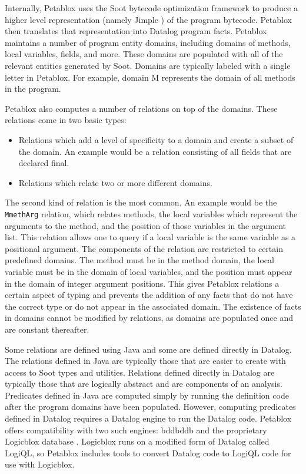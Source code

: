 Internally, Petablox uses the Soot bytecode optimization framework \cite{vallee1999soot} to produce a higher level representation (namely Jimple \cite{vallee1998jimple}) of the program bytecode. Petablox then translates that representation into Datalog program facts. Petablox maintains a number of program entity domains, including domains of methods, local variables, fields, and more. These domains are populated with all of the relevant entities generated by Soot. Domains are typically labeled with a single letter in Petablox. For example, domain M represents the domain of all methods in the program.

Petablox also computes a number of relations on top of the domains. These relations come in two basic types:

\begin{itemize}
  \item Relations which add a level of specificity to a domain and create a subset of the domain. An example would be a relation consisting of all fields that are declared final.
  \item Relations which relate two or more different domains.
\end{itemize}

The second kind of relation is the most common. An example would be the \texttt{MmethArg} relation, which relates methods, the local variables which represent the arguments to the method, and the position of those variables in the argument list. This relation allows one to query if a local variable is the same variable as a positional argument. The components of the relation are restricted to certain predefined domains. The method must be in the method domain, the local variable must be in the domain of local variables, and the position must appear in the domain of integer argument positions. This gives Petablox relations a certain aspect of typing and prevents the addition of any facts that do not have the correct type or do not appear in the associated domain. The existence of facts in domains cannot be modified by relations, as domains are populated once and are constant thereafter. 

Some relations are defined using Java and some are defined directly in Datalog. The relations defined in Java are typically those that are easier to create with access to Soot types and utilities. Relations defined directly in Datalog are typically those that are logically abstract and are components of an analysis. Predicates defined in Java are computed simply by running the definition code after the program domains have been populated. However, computing predicates defined in Datalog requires a Datalog engine to run the Datalog code. Petablox offers compatibility with two such engines: bddbddb \cite{bddbddb} and the proprietary Logicblox database \cite{logicblox}. Logicblox runs on a modified form of Datalog called LogiQL, so Petablox includes tools to convert Datalog code to LogiQL code for use with Logicblox.


